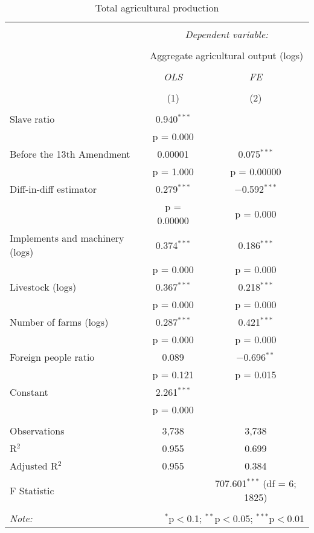 \documentclass[12pt]{report}
\begin{document}
\begin{table}[!htbp] \centering 
  \caption{Total agricultural production} 
  \label{tab:agoutnopop} 
\begin{tabular}{@{\extracolsep{5pt}}lcc} 
\\[-1.8ex]\hline 
\hline \\[-1.8ex] 
 & \multicolumn{2}{c}{\textit{Dependent variable:}} \\ 
\cline{2-3} 
\\[-1.8ex] & \multicolumn{2}{c}{Aggregate agricultural output (logs)} \\ 
\\[-1.8ex] & \textit{OLS} & \textit{FE} \\ 
\\[-1.8ex] & (1) & (2)\\ 
\hline \\[-1.8ex] 
 Slave ratio & 0.940$^{***}$ &  \\ 
  & p = 0.000 &  \\ 
  Before the 13th Amendment & 0.00001 & 0.075$^{***}$ \\ 
  & p = 1.000 & p = 0.00000 \\ 
  Diff-in-diff estimator & 0.279$^{***}$ & $-$0.592$^{***}$ \\ 
  & p = 0.00000 & p = 0.000 \\ 
  Implements and machinery (logs) & 0.374$^{***}$ & 0.186$^{***}$ \\ 
  & p = 0.000 & p = 0.000 \\ 
  Livestock (logs) & 0.367$^{***}$ & 0.218$^{***}$ \\ 
  & p = 0.000 & p = 0.000 \\ 
  Number of farms (logs) & 0.287$^{***}$ & 0.421$^{***}$ \\ 
  & p = 0.000 & p = 0.000 \\ 
  Foreign people ratio & 0.089 & $-$0.696$^{**}$ \\ 
  & p = 0.121 & p = 0.015 \\ 
  Constant & 2.261$^{***}$ &  \\ 
  & p = 0.000 &  \\ 
 \hline \\[-1.8ex] 
Observations & 3,738 & 3,738 \\ 
R$^{2}$ & 0.955 & 0.699 \\ 
Adjusted R$^{2}$ & 0.955 & 0.384 \\ 
F Statistic &  & 707.601$^{***}$ (df = 6; 1825) \\ 
\hline 
\hline \\[-1.8ex] 
\textit{Note:}  & \multicolumn{2}{r}{$^{*}$p$<$0.1; $^{**}$p$<$0.05; $^{***}$p$<$0.01} \\ 
\end{tabular} 
\end{table} 
\end{document}
